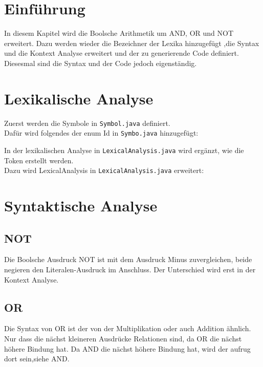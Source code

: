 \section{Einführung}
In diesem Kapitel wird die Boolsche Arithmetik um AND, OR und NOT erweitert.
Dazu werden wieder die Bezeichner der Lexika hinzugefügt ,die Syntax und die Kontext Analyse erweitert und der zu generierende Code definiert.  Diesesmal sind die Syntax und der Code jedoch eigenständig. 

\section{Lexikalische Analyse}
Zuerst werden die Symbole in  \verb|Symbol.java| definiert.\\
Dafür wird folgendes der enum Id in \verb|Symbo.java| hinzugefügt:

In der lexikalischen Analyse in \verb|LexicalAnalysis.java| wird ergänzt, wie die Token erstellt werden.\\
Dazu wird LexicalAnalysis in \verb|LexicalAnalysis.java| erweitert:


\section{Syntaktische Analyse}
\subsection{NOT}
Die Boolsche Ausdruck NOT ist mit dem Ausdruck Minus zuvergleichen, beide negieren den Literalen-Ausdruck im Anschluss.
Der Unterschied wird erst in der Kontext Analyse.


\subsection{OR}
Die Syntax von OR ist der von der Multiplikation oder auch Addition ähnlich. 
Nur dass die nächst kleineren Ausdrücke Relationen sind, da OR die nächst höhere  Bindung hat.
Da AND die nächst höhere Bindung hat, wird der aufrug dort sein,siehe AND.

